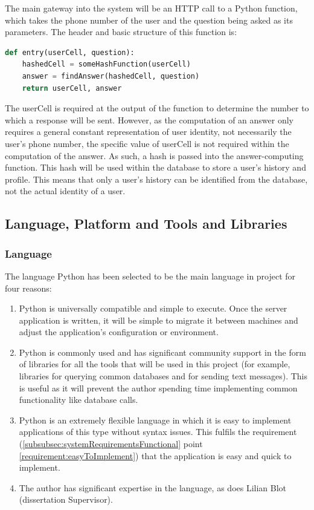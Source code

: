 \documentclass{article}
\begin{document}
The main gateway into the system will be an HTTP call to a Python function, which takes the phone number of the user and the question being asked as its parameters.  The header and basic structure of this function is:

\begin{lstlisting}[language=Python]
def entry(userCell, question):
    hashedCell = someHashFunction(userCell)
    answer = findAnswer(hashedCell, question)
    return userCell, answer
\end{lstlisting}

The userCell is required at the output of the function to determine the number to which a response will be sent.  However, as the computation of an answer only requires a general constant representation of user identity, not necessarily the user's phone number, the specific value of userCell is not required within the computation of the answer.  As such, a hash is passed into the answer-computing function.  This hash will be used within the database to store a user's history and profile.  This means that only a user's history can be identified from the database, not the actual identity of a user.

\subsection{Language, Platform and Tools and Libraries}
\subsubsection{Language}
The language Python has been selected to be the main language in project for four reasons:
\begin{enumerate}
  \item Python is universally compatible and simple to execute.  Once the server application is written, it will be simple to migrate it between machines and adjust the application's configuration or environment.
  \item Python is commonly used and has significant community support in the form of libraries for all the tools that will be used in this project (for example, libraries for querying common databases and for sending text messages).  This is useful as it will prevent the author spending time implementing common functionality like database calls.
  \item Python is an extremely flexible language in which it is easy to implement applications of this type without syntax issues.  This fulfils the requirement (\ref{subsubsec:systemRequirementsFunctional} point \ref{requirement:easyToImplement}) that the application is easy and quick to implement.
  \item The author has significant expertise in the language, as does Lilian Blot (dissertation Supervisor).
\end{enumerate}
\end{document}
